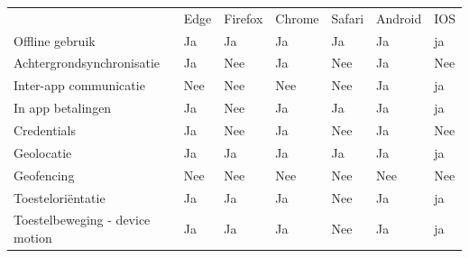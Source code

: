  		\begin{table}[]
 			\centering
			\begin{tabular}{p{6cm}p{13mm}p{13mm}p{13mm}p{13mm}p{13mm}p{13mm}}
 			
				& Edge & Firefox & Chrome & Safari& Android & IOS \\ 
			   
			   Offline gebruik & \cellcolor{green!40} Ja  & \cellcolor{green!40} Ja & \cellcolor{green!40} Ja  & \cellcolor{green!40} Ja & \cellcolor{green!40} Ja & \cellcolor{green!40} ja \\
			   
			   Achtergrondsynchronisatie & \cellcolor{green!40} Ja  &  \cellcolor{red!50} Nee& \cellcolor{green!40} Ja  &  \cellcolor{red!50} Nee& \cellcolor{green!40} Ja & \cellcolor{red!50} Nee \\
			   
			   Inter-app communicatie & \cellcolor{red!50} Nee  &  \cellcolor{red!50} Nee& \cellcolor{red!50} Nee  &  \cellcolor{red!50} Nee& \cellcolor{green!40} Ja & \cellcolor{green!40} ja \\
			   
			   In app betalingen & \cellcolor{green!40} Ja  &\cellcolor{red!50} Nee & \cellcolor{green!40} Ja  & \cellcolor{green!40} Ja & \cellcolor{green!40} Ja & \cellcolor{green!40} ja \\
			   
			   Credentials & \cellcolor{green!40} Ja  & \cellcolor{red!50} Nee & \cellcolor{green!40} Ja  & \cellcolor{red!50} Nee & \cellcolor{green!40} Ja & \cellcolor{red!50} Nee \\
			   
			   Geolocatie & \cellcolor{green!40} Ja  & \cellcolor{green!40} Ja & \cellcolor{green!40} Ja  & \cellcolor{green!40} Ja & \cellcolor{green!40} Ja & \cellcolor{green!40} ja \\
			   
			   Geofencing &  \cellcolor{red!50} Nee  &  \cellcolor{red!50} Nee &  \cellcolor{red!50} Nee  & \cellcolor{red!50} Nee &  \cellcolor{red!50} Nee &  \cellcolor{red!50} Nee \\
			   
			   Toesteloriëntatie & \cellcolor{green!40} Ja  & \cellcolor{green!40} Ja & \cellcolor{green!40} Ja  & \cellcolor{red!50} Nee& \cellcolor{green!40} Ja & \cellcolor{green!40} ja \\
			   
			   Toestelbeweging - device motion & \cellcolor{green!40} Ja  & \cellcolor{green!40} Ja & \cellcolor{green!40} Ja  & \cellcolor{red!50} Nee& \cellcolor{green!40} Ja & \cellcolor{green!40} ja \\
			   

\end{tabular}
\end{table}
